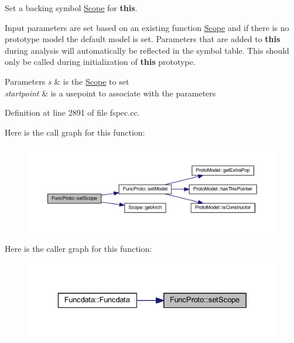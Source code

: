 Set a backing symbol \mbox{\hyperlink{class_scope}{Scope}} for {\bfseries{this}}. 

Input parameters are set based on an existing function \mbox{\hyperlink{class_scope}{Scope}} and if there is no prototype model the default model is set. Parameters that are added to {\bfseries{this}} during analysis will automatically be reflected in the symbol table. This should only be called during initialization of {\bfseries{this}} prototype. 
\begin{DoxyParams}{Parameters}
{\em s} & is the \mbox{\hyperlink{class_scope}{Scope}} to set \\
\hline
{\em startpoint} & is a usepoint to associate with the parameters \\
\hline
\end{DoxyParams}


Definition at line 2891 of file fspec.\+cc.

Here is the call graph for this function\+:
\nopagebreak
\begin{figure}[H]
\begin{center}
\leavevmode
\includegraphics[width=350pt]{class_func_proto_adc83eddece4cb123d198ad288dfa89bd_cgraph}
\end{center}
\end{figure}
Here is the caller graph for this function\+:
\nopagebreak
\begin{figure}[H]
\begin{center}
\leavevmode
\includegraphics[width=329pt]{class_func_proto_adc83eddece4cb123d198ad288dfa89bd_icgraph}
\end{center}
\end{figure}
\mbox{\label{class_func_proto_a4b4b02b22968723dcdb23ba51955e96e}} 

